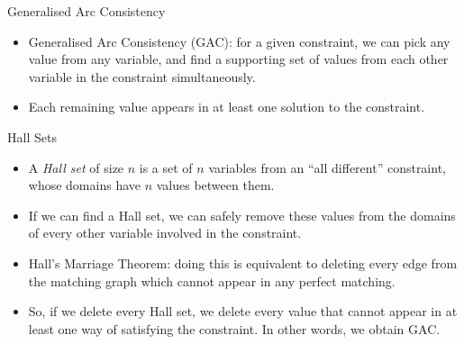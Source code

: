 \documentclass[aspectratio=169,compress,10pt]{beamer}
\begin{document}
\begin{frame}{Generalised Arc Consistency}
    \begin{itemize}
        \item Generalised Arc Consistency (GAC): for a given constraint, we can pick any value from any
            variable, and find a supporting set of values from each other variable in the constraint
            simultaneously.
        \item Each remaining value appears in at least one solution to the constraint.
    \end{itemize}
\end{frame}

\begin{frame}{Hall Sets}
    \begin{itemize}
        \item A \emph{Hall set} of size $n$ is a set of $n$ variables from an ``all different''
            constraint, whose domains have $n$ values between them.

        \item If we can find a Hall set, we can safely remove these values from the domains of every
            other variable involved in the constraint.

        \item Hall's Marriage Theorem: doing this is equivalent to deleting every edge from the
            matching graph which cannot appear in any perfect matching.

        \item So, if we delete every Hall set, we delete every value that cannot appear in at least
            one way of satisfying the constraint. In other words, we obtain GAC.
    \end{itemize}
\end{frame}
\end{document}
